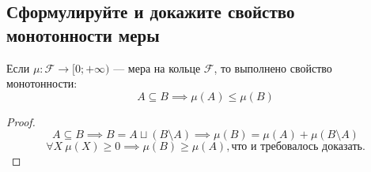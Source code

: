 
\subsection{Сформулируйте и докажите свойство монотонности меры}
        
    Если $\mu : \mathcal{F} \to [0; +\infty)$ --- мера на кольце $\mathcal{F}$, 
    то выполнено свойство монотонности:
    \[ A \subseteq B \implies \mu(A) \le \mu(B) \]
    \begin{proof}
        \[ A \subseteq B \implies B = A \sqcup (B \setminus A) \implies \mu(B)
        = \mu(A) + \mu(B \setminus A) \]
        \[ \forall X\: \mu(X) \ge 0 \implies \mu(B) \ge \mu(A), \text{что и требовалось доказать}. \]
    \end{proof}

